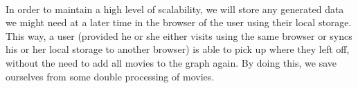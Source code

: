 \paragraph{}
In order to maintain a high level of scalability, we will store any generated
data we might need at a later time in the browser of the user using their local
storage.
This way, a user (provided he or she either visits using the same browser or
syncs his or her local storage to another browser) is able to pick up where they
left off, without the need to add all movies to the graph again.
By doing this, we save ourselves from some double processing of movies.
